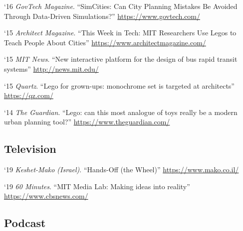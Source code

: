 \begin{tablist}
    \item[`16] \tab \textit{GovTech Magazine}. \enquote{SimCities: Can City Planning Mistakes Be Avoided Through Data-Driven Simulations?}
    \href{https://www.govtech.com/data/SimCities-Can-City-Planning-Mistakes-Be-Avoided-Through-Data-Driven-Simulations.html}{https://www.govtech.com/}

    \item[`15] \tab \textit{Architect Magazine}. \enquote{This Week in Tech: MIT Researchers Use Legos to Teach People About Cities}
    \href{https://www.architectmagazine.com/technology/this-week-in-tech-mit-researchers-use-legos-to-teach-people-about-cities_o}{https://www.architectmagazine.com/}

    \item[`15] \tab \textit{MIT News}. \enquote{New interactive platform for the design of bus rapid transit systems}
    \href{http://news.mit.edu/2015/interactive-platform-design-bus-rapid-transit-brt-systems-1007}{http://news.mit.edu/}

    \item[`15] \tab \textit{Quartz}. \enquote{Lego for grown-ups: monochrome set is targeted at architects}
    \href{https://qz.com/315776/lego-for-grown-ups-the-toy-maker-is-targeting-architects-and-urban-planners/}{https://qz.com/}

    \item[`14] \tab \textit{The Guardian}. \enquote{Lego: can this most analogue of toys really be a modern urban planning tool?}
    \href{https://www.theguardian.com/cities/2014/dec/18/lego-toys-urban-planning-tool-architects-mit}{https://www.theguardian.com/}

    \subsection*{Television}
    \item[`19] \tab \textit{Keshet-Mako (Israel)}. \enquote{Hands-Off (the Wheel)}
    \href{https://www.mako.co.il/nexter-weekend/Article-29c0ce116238d51006.htm}{https://www.mako.co.il/}

    \item[`19] \tab \textit{60 Minutes}. \enquote{MIT Media Lab: Making ideas into reality}
    \href{https://www.cbsnews.com/news/60-minutes-mit-media-lab-making-ideas-into-reality-future-factory-2019-08-04/}{https://www.cbsnews.com/}

    \subsection*{Podcast}


\end{tablist}

